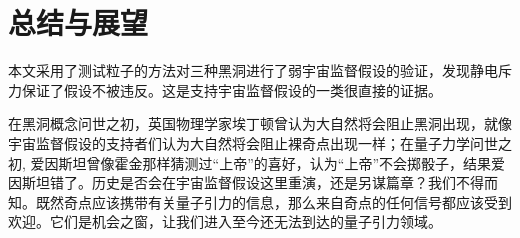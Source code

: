 \chapter{总结与展望}

本文采用了测试粒子的方法对三种黑洞进行了弱宇宙监督假设的验证，发现静电斥力保证了假设不被违反。这是支持宇宙监督假设的一类很直接的证据。

在黑洞概念问世之初，英国物理学家埃丁顿曾认为大自然将会阻止黑洞出现，就像宇宙监督假设的支持者们认为大自然将会阻止裸奇点出现一样；在量子力学问世之初, 爱因斯坦曾像霍金那样猜测过“上帝”的喜好，认为“上帝”不会掷骰子，结果爱因斯坦错了。历史是否会在宇宙监督假设这里重演，还是另谋篇章？我们不得而知。既然奇点应该携带有关量子引力的信息，那么来自奇点的任何信号都应该受到欢迎。它们是机会之窗，让我们进入至今还无法到达的量子引力领域\citep{ong2020space}。